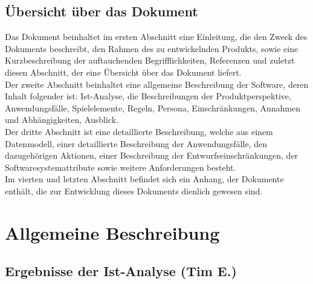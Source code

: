 \documentclass[fontsize=12pt,paper=a4,twoside]{scrartcl}
\begin{document}
\subsection{Übersicht über das Dokument}

  
Das Dokument beinhaltet im ersten Abschnitt eine Einleitung, die den Zweck des Dokuments beschreibt,
den Rahmen des zu entwickelnden Produkts, sowie eine Kurzbeschreibung der auftauchenden Begrifflichkeiten, Referenzen und zuletzt diesen Abschnitt, der eine Übersicht über das Dokument liefert.\\

Der zweite Abschnitt beinhaltet eine allgemeine Beschreibung der Software, deren Inhalt folgender ist: Ist-Analyse, die Beschreibungen der Produktperspektive, Anwendungsfälle, Spielelemente, Regeln, Persona, Einschränkungen, Annahmen und
Abhängigkeiten, Ausblick.\\

Der dritte Abschnitt ist eine detaillierte Beschreibung, welche aus einem Datenmodell, einer detaillierte Beschreibung der Anwendungsfälle, den dazugehörigen Aktionen, einer Beschreibung der Entwurfseinschränkungen, der Softwaresystemattribute sowie weitere Anforderungen besteht.\\

Im vierten und letzten Abschnitt befindet sich ein Anhang, der Dokumente enthält, die zur Entwicklung dieses
Dokuments dienlich gewesen sind.


\section{Allgemeine Beschreibung}
\label{ch:AllgemeineBeschreibung}

\subsection{Ergebnisse der Ist-Analyse (Tim E.)}
  
\end{document}
